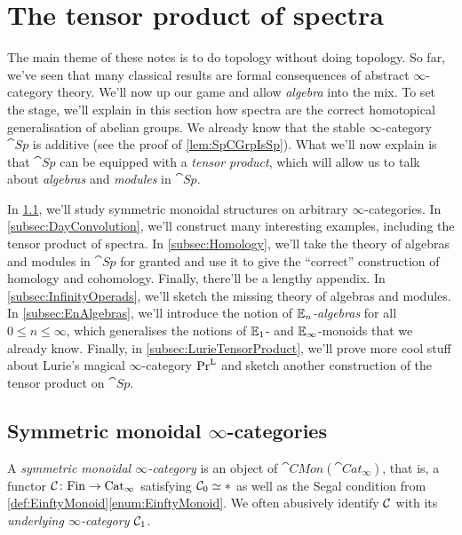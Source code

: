 \section{The tensor product of spectra}\label{sec:TensorProduct}
The main theme of these notes is to do topology without doing topology. So far, we've seen that many classical results are formal consequences of abstract $\infty$-category theory. We'll now up our game and allow \emph{algebra} into the mix. To set the stage, we'll explain in this section how spectra are the correct homotopical generalisation of abelian groups. We already know that the stable $\infty$-category $\cat{Sp}$ is additive (see the proof of \cref{lem:SpCGrpIsSp}). What we'll now explain is that $\cat{Sp}$ can be equipped with a \emph{tensor product}, which will allow us to talk about \emph{algebras} and \emph{modules} in $\cat{Sp}$.

In \cref{subsec:SymmetricMonoidal}, we'll study symmetric monoidal structures on arbitrary $\infty$-categories. In \cref{subsec:DayConvolution}, we'll construct many interesting examples, including the tensor product of spectra. In \cref{subsec:Homology}, we'll take the theory of algebras and modules in $\cat{Sp}$ for granted and use it to give the \enquote{correct} construction of homology and cohomology. Finally, there'll be a lengthy appendix. In \cref{subsec:InfinityOperads}, we'll sketch the missing theory of algebras and modules. In \cref{subsec:EnAlgebras}, we'll introduce the notion of \emph{$\mathbb{E}_n$-algebras} for all $0\leqslant n\leqslant \infty$, which generalises the notions of $\mathbb{E}_1$- and $\mathbb{E}_\infty$-monoids that we already know. Finally, in \cref{subsec:LurieTensorProduct}, we'll prove more cool stuff about Lurie's magical $\infty$-category $\mathrm{Pr}^{\mathrm{L}}$ and sketch another construction of the tensor product on $\cat{Sp}$.


\subsection{Symmetric monoidal \texorpdfstring{$\infty$}{Infinity}-categories}\label{subsec:SymmetricMonoidal}
\begin{defi}\label{def:SymmetricMonoidal}
	A \emph{symmetric monoidal $\infty$-category} is an object of $\cat{CMon}(\cat{Cat}_\infty)$, that is, a functor $\mathcal{C}\colon \mathrm{Fin}\rightarrow \mathrm{Cat}_\infty$ satisfying $\mathcal{C}_0\simeq *$ as well as the Segal condition from \cref{def:EinftyMonoid}\cref{enum:EinftyMonoid}. We often abusively identify $\mathcal{C}$ with its \emph{underlying $\infty$-category} $\mathcal{C}_1$.
\end{defi}

